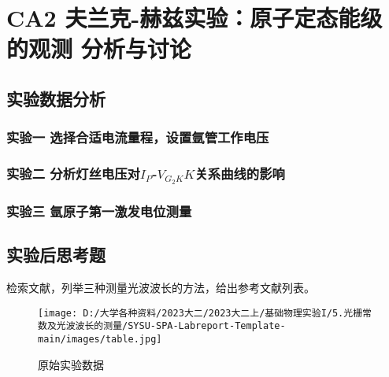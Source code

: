 \documentclass[dvipsnames, svgnames,a4paper,11pt]{article}
\begin{document}
\section{CA2 \quad 夫兰克-赫兹实验：原子定态能级的观测 \quad\heiti 分析与讨论}

\subsection{实验数据分析}


	\subsubsection{实验一 \quad 选择合适电流量程，设置氩管工作电压}
		
		



	\subsubsection{实验二 \quad 分析灯丝电压对$I_P$-$V_{G_2K}K$关系曲线的影响}






	\subsubsection{实验三 \quad 氩原子第一激发电位测量}
			
			
			
			
\subsection{实验后思考题}



\begin{question}
	检索文献，列举三种测量光波波长的方法，给出参考文献列表。%
\end{question}
	
	


\begin{figure}[H]
	\centering
	\texttt{[image: D:/大学各种资料/2023大二/2023大二上/基础物理实验I/5.光栅常数及光波波长的测量/SYSU-SPA-Labreport-Template-main/images/table.jpg]}
	\caption{原始实验数据}
\end{figure}
	
\end{document}
